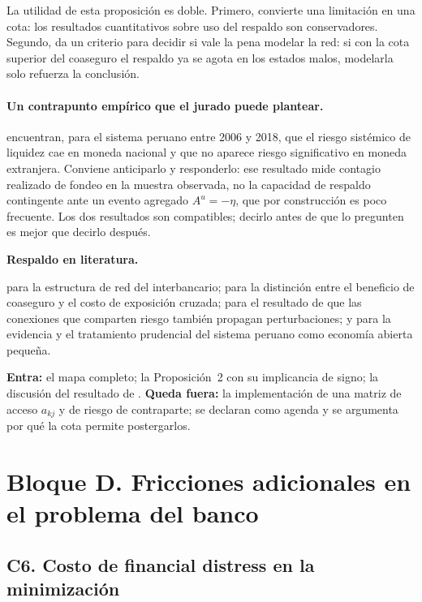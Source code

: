 \documentclass[11pt]{article}
\newcommand{\lit}{\par\noindent\textbf{Respaldo en literatura.}\par}
\theoremstyle{definition}
\begin{document}
\noindent La utilidad de esta proposici\'on es doble. Primero, convierte una
limitaci\'on en una cota: los resultados cuantitativos sobre uso del respaldo son
conservadores. Segundo, da un criterio para decidir si vale la pena modelar la
red: si con la cota superior del coaseguro el respaldo ya se agota en los estados
malos, modelarla solo refuerza la conclusi\'on.

\paragraph{Un contrapunto emp\'irico que el jurado puede plantear.}
\citet{cuba2020} encuentran, para el sistema peruano entre 2006 y 2018, que el
riesgo sistémico de liquidez cae en moneda nacional y que no aparece riesgo
significativo en moneda extranjera. Conviene anticiparlo y responderlo: ese
resultado mide contagio realizado de fondeo en la muestra observada, no la
capacidad de respaldo contingente ante un evento agregado $A^u=-\eta$, que por
construcci\'on es poco frecuente. Los dos resultados son compatibles; decirlo
antes de que lo pregunten es mejor que decirlo despu\'es.

\lit
\citet{craigvonpeter2014} para la estructura de red del interbancario;
\citet{rochettirole1996} para la distinci\'on entre el beneficio de coaseguro y el
costo de exposici\'on cruzada; \citet{allen2000contagion} para el resultado de que
las conexiones que comparten riesgo tambi\'en propagan perturbaciones;
\citet{cuba2020} y \citet{carrera2014} para la evidencia y el tratamiento
prudencial del sistema peruano como econom\'ia abierta peque\~na.

\begin{ie2}
\textbf{Entra:} el mapa completo; la Proposici\'on~2 con su implicancia de signo;
la discusi\'on del resultado de \citet{cuba2020}.
\textbf{Queda fuera:} la implementaci\'on de una matriz de acceso $a_{kj}$ y de
riesgo de contraparte; se declaran como agenda y se argumenta por qu\'e la cota
permite postergarlos.
\end{ie2}

\section{Bloque D. Fricciones adicionales en el problema del banco}

\subsection{C6. Costo de financial distress en la minimizaci\'on}\label{sub:C6}
\end{document}
